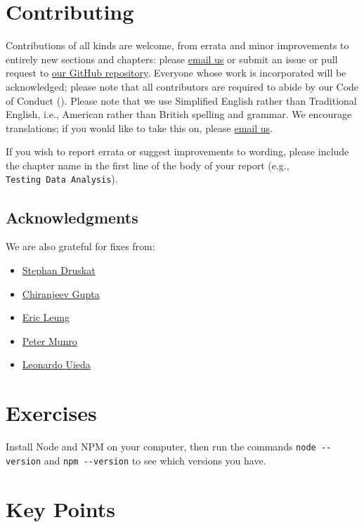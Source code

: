 \section{Contributing}\label{s:index-contrib}

Contributions of all kinds are welcome, from errata and minor improvements to
entirely new sections and chapters: please
\href{mailto:gvwilson@third-bit.com}{email us} or submit an issue or pull
request to \href{https://github.com/software-tools-in-javascript/js4ds/}{our
  GitHub repository}. Everyone whose work is incorporated will be acknowledged;
please note that all contributors are required to abide by our Code of Conduct
().  Please note that we use Simplified English rather than
Traditional English, i.e., American rather than British spelling and grammar. We
encourage translations; if you would like to take this on, please
\href{mailto:gvwilson@third-bit.com}{email us}.

If you wish to report errata or suggest improvements to wording, please include
the chapter name in the first line of the body of your report (e.g., \texttt{Testing\ Data\ Analysis}).

\subsection{Acknowledgments}\label{s:intro-acknowledgments}

We are also grateful for fixes from:

\begin{itemize}
\item
  \href{https://github.com/sdruskat}{Stephan Druskat}
\item
  \href{https://github.com/cRAN-cg}{Chiranjeev Gupta}
\item
  \href{https://erictleung.com/}{Eric Leung}
\item
  \href{https://github.com/pdm55}{Peter Munro}
\item
  \href{http://www.leouieda.com/}{Leonardo Uieda}
\end{itemize}

\section{Exercises}\label{s:intro-exercises}


Install Node and NPM on your computer,
then run the commands \texttt{node\ -\/-version} and \texttt{npm\ -\/-version}
to see which versions you have.

\section*{Key Points}


